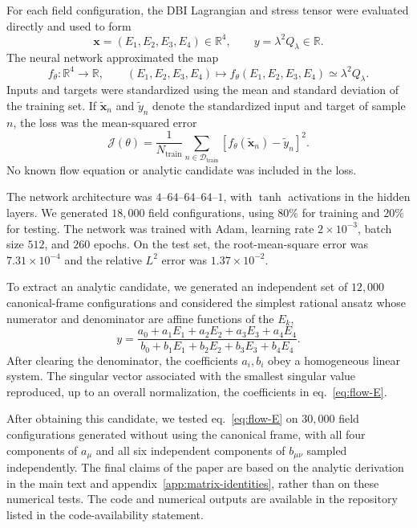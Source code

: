 \documentclass[a4paper,11pt]{article}
\numberwithin{equation}{section}
\begin{document}
For each field configuration, the DBI Lagrangian and stress tensor were evaluated directly and used to form
\begin{equation}
 \bm{x}=(E_1,E_2,E_3,E_4)\in\mathbb R^4,
 \qquad
 y=\lambda^2Q_\lambda\in\mathbb R.
 \label{eq:nn-data}
\end{equation}
The neural network approximated the map
\begin{equation}
 f_\theta:\mathbb R^4\longrightarrow\mathbb R,
 \qquad
 (E_1,E_2,E_3,E_4)\longmapsto f_\theta(E_1,E_2,E_3,E_4)\simeq\lambda^2Q_\lambda.
 \label{eq:nn-map}
\end{equation}
Inputs and targets were standardized using the mean and standard deviation of the training set. If $\widetilde{\bm{x}}_n$ and $\widetilde y_n$ denote the standardized input and target of sample $n$, the loss was the mean-squared error
\begin{equation}
 \mathcal J(\theta)
 =\frac1{N_{\mathrm{train}}}
 \sum_{n\in\mathcal D_{\mathrm{train}}}
 \left[f_\theta(\widetilde{\bm{x}}_n)-\widetilde y_n\right]^2.
 \label{eq:nn-loss}
\end{equation}
No known flow equation or analytic candidate was included in the loss.

The network architecture was $4$--$64$--$64$--$64$--$1$, with $\tanh$ activations in the hidden layers. We generated $18{,}000$ field configurations, using $80\%$ for training and $20\%$ for testing. The network was trained with Adam, learning rate $2\times10^{-3}$, batch size $512$, and $260$ epochs. On the test set, the root-mean-square error was $7.31\times10^{-4}$ and the relative $L^2$ error was $1.37\times10^{-2}$.

To extract an analytic candidate, we generated an independent set of $12{,}000$ canonical-frame configurations and considered the simplest rational ansatz whose numerator and denominator are affine functions of the $E_k$,
\begin{equation}
 y=\frac{a_0+a_1E_1+a_2E_2+a_3E_3+a_4E_4}
 {b_0+b_1E_1+b_2E_2+b_3E_3+b_4E_4}.
 \label{eq:rational-ansatz}
\end{equation}
After clearing the denominator, the coefficients $a_i,b_i$ obey a homogeneous linear system. The singular vector associated with the smallest singular value reproduced, up to an overall normalization, the coefficients in eq.~\eqref{eq:flow-E}.

After obtaining this candidate, we tested eq.~\eqref{eq:flow-E} on $30{,}000$ field configurations generated without using the canonical frame, with all four components of $a_\mu$ and all six independent components of $b_{\mu\nu}$ sampled independently. The final claims of the paper are based on the analytic derivation in the main text and appendix~\ref{app:matrix-identities}, rather than on these numerical tests. The code and numerical outputs are available in the repository listed in the code-availability statement.
\end{document}
